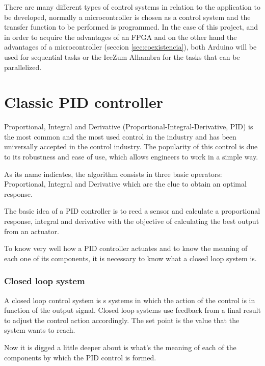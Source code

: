 There are many different types of control systems in relation to the application to be developed, normally a microcontroller is chosen as a control system and the transfer function to be performed is programmed.\newline
In the case of this project, and in order to acquire the advantages of an FPGA and on the other hand the advantages of a microcontroller (seccion \ref{sec:coexistencia}), both Arduino will be used for sequential tasks or the IceZum Alhambra for the tasks that can be parallelized. \newline
\section{Classic PID controller}\label{sec:PID}

Proportional, Integral and Derivative (Proportional-Integral-Derivative, PID) \cite{nemadesign} is the most common and the most used control in the industry and has been universally accepted in the control industry. The popularity of this control is due to its robustness and ease of use, which allows engineers to work in a simple way. \newline

As its name indicates, the algorithm consists in three basic operators: Proportional, Integral and Derivative which are the clue to obtain an optimal response. \newline

The basic idea of a PID controller is to reed a sensor and calculate a proportional response, integral and derivative with the objective of calculating the best output from an actuator. \newline

To know very well how a PID controller actuates and to know the meaning of each one of its components, it is necessary to know what a closed loop system is. 

\subsubsection{Closed loop system}
A closed loop control system is s systems in which the action of the control is in function of the output signal. Closed loop systems use feedback from a final result to adjust the control action accordingly. The set point is the value that the system wants to reach. \newline

Now it is digged a little deeper about is what’s the meaning of each of the components by which the PID control is formed.\newline
